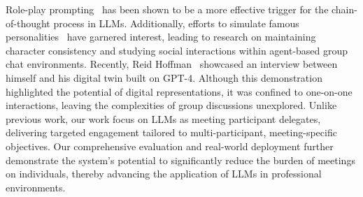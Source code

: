 
Role-play prompting~\cite{kong2024roleplay} has been shown to be a more effective trigger for the chain-of-thought process in LLMs. Additionally, efforts to simulate famous personalities~\cite{shao2023character, Sun2024persona} have garnered interest, leading to research on maintaining character consistency and studying social interactions within agent-based group chat environments. Recently, Reid Hoffman~\cite{ReidHoffman} showcased an interview between himself and his digital twin built on GPT-4. Although this demonstration highlighted the potential of digital representations, it was confined to one-on-one interactions, leaving the complexities of group discussions unexplored. Unlike previous work, our work focus on LLMs as meeting participant delegates, delivering targeted engagement tailored to multi-participant, meeting-specific objectives. Our comprehensive evaluation and real-world deployment further demonstrate the system's potential to significantly reduce the burden of meetings on individuals, thereby advancing the application of LLMs in professional environments.


%